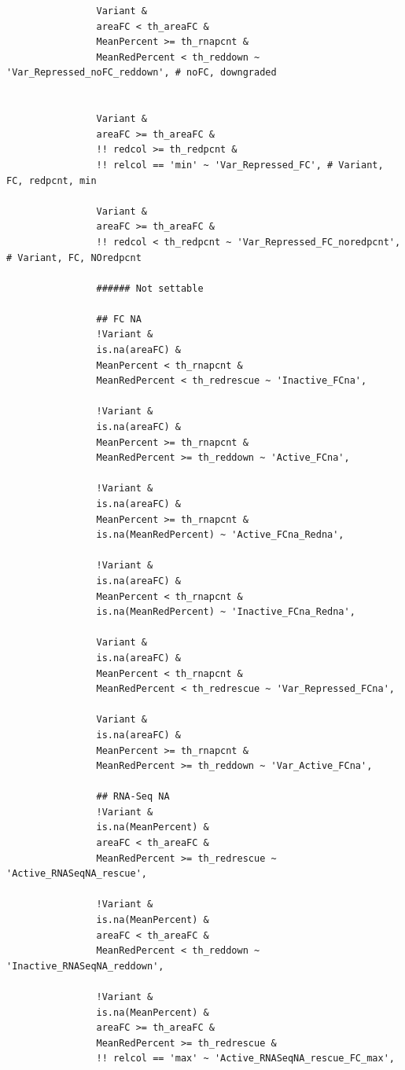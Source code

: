 \documentclass[11pt]{article}
\begin{document}
\begin{verbatim}
                Variant &
                areaFC < th_areaFC &
                MeanPercent >= th_rnapcnt &
                MeanRedPercent < th_reddown ~ 'Var_Repressed_noFC_reddown', # noFC, downgraded


                Variant &
                areaFC >= th_areaFC &
                !! redcol >= th_redpcnt &
                !! relcol == 'min' ~ 'Var_Repressed_FC', # Variant, FC, redpcnt, min

                Variant &
                areaFC >= th_areaFC &
                !! redcol < th_redpcnt ~ 'Var_Repressed_FC_noredpcnt', # Variant, FC, NOredpcnt

                ###### Not settable

                ## FC NA
                !Variant &
                is.na(areaFC) &
                MeanPercent < th_rnapcnt &
                MeanRedPercent < th_redrescue ~ 'Inactive_FCna',

                !Variant &
                is.na(areaFC) &
                MeanPercent >= th_rnapcnt &
                MeanRedPercent >= th_reddown ~ 'Active_FCna',

                !Variant &
                is.na(areaFC) &
                MeanPercent >= th_rnapcnt &
                is.na(MeanRedPercent) ~ 'Active_FCna_Redna',

                !Variant &
                is.na(areaFC) &
                MeanPercent < th_rnapcnt &
                is.na(MeanRedPercent) ~ 'Inactive_FCna_Redna',

                Variant &
                is.na(areaFC) &
                MeanPercent < th_rnapcnt &
                MeanRedPercent < th_redrescue ~ 'Var_Repressed_FCna',

                Variant &
                is.na(areaFC) &
                MeanPercent >= th_rnapcnt &
                MeanRedPercent >= th_reddown ~ 'Var_Active_FCna',

                ## RNA-Seq NA
                !Variant &
                is.na(MeanPercent) &
                areaFC < th_areaFC &
                MeanRedPercent >= th_redrescue ~ 'Active_RNASeqNA_rescue',

                !Variant &
                is.na(MeanPercent) &
                areaFC < th_areaFC &
                MeanRedPercent < th_reddown ~ 'Inactive_RNASeqNA_reddown',

                !Variant &
                is.na(MeanPercent) &
                areaFC >= th_areaFC &
                MeanRedPercent >= th_redrescue &
                !! relcol == 'max' ~ 'Active_RNASeqNA_rescue_FC_max',


\end{verbatim}
\end{document}
